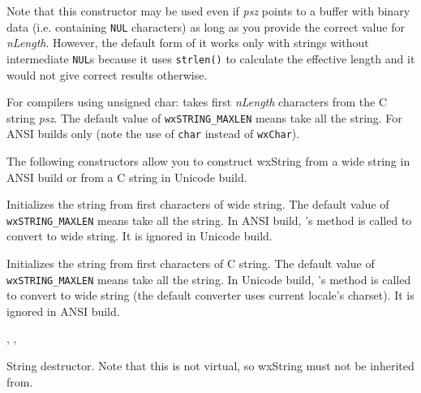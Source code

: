 Note that this constructor may be used even if {\it psz} points to a buffer
with binary data (i.e. containing {\tt NUL} characters) as long as you provide
the correct value for {\it nLength}. However, the default form of it works
only with strings without intermediate {\tt NUL}s because it uses 
{\tt strlen()} to calculate the effective length and it would not give correct
results otherwise.


For compilers using unsigned char: takes first {\it nLength} characters from the C string {\it psz}.
The default value of {\tt wxSTRING\_MAXLEN} means take all the string.
For ANSI builds only (note the use of {\tt char} instead of {\tt wxChar}).


The following constructors allow you to construct wxString from a wide string
in ANSI build or from a C string in Unicode build.


Initializes the string from first  characters of wide string. 
The default value of {\tt wxSTRING\_MAXLEN} means take all the string.
In ANSI build, 's 
 method is called to
convert  to wide string. It is ignored in Unicode build.


Initializes the string from first  characters of C string.
The default value of {\tt wxSTRING\_MAXLEN} means take all the string.
In Unicode build, 's 
 method is called to
convert  to wide string (the default converter uses current locale's
charset). It is ignored in ANSI build.


, ,


\label{wxstringdestruct}


String destructor. Note that this is not virtual, so wxString must not be inherited from.


